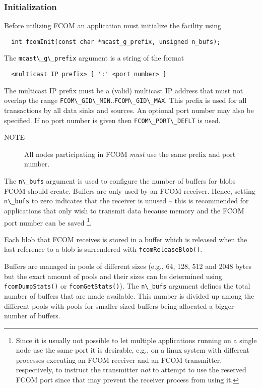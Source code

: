 \documentclass[11pt]{article}
\newcommand{\fcom}{FCOM}
\newcommand{\blob}{blob}
\newcommand{\cstl}[1]{{\lstinline+#1+}}
\newcommand{\note}[1]{
	\begin{description}
		\item[NOTE] #1
	\end{description}
}
\begin{document}
    \subsubsection{Initialization}
      Before utilizing \fcom{} an application must initialize
      the facility using
      \begin{verbatim}
  int fcomInit(const char *mcast_g_prefix, unsigned n_bufs);
      \end{verbatim}
      The \cstl{mcast\_g\_prefix} argument is a string of
      the format
      \begin{verbatim}
  <multicast IP prefix> [ ':' <port number> ]
      \end{verbatim}
      The multicast IP prefix must be a (valid) multicast
      IP address that must not overlap the range
      \cstl{FCOM\_GID\_MIN}..\cstl{FCOM\_GID\_MAX}. This
      prefix is used for all transactions by all data
      sinks and sources. An optional port number may
      also be specified. If no port number is given then
      \cstl{FCOM\_PORT\_DEFLT} is used.

      \note{All nodes participating in \fcom{} {\em must} use the
      same prefix and port number.}

      The \cstl{n\_bufs} argument is used to configure the
      number of buffers for \blob{}s \fcom{} should create.
      Buffers are only used by an \fcom{} receiver. Hence,
      setting \cstl{n\_bufs} to zero indicates that the
      receiver is unused -- this is recommended for applications
      that only wish to transmit data because memory and
      the \fcom{} port number can be saved%
\footnote{Since it is usually not possible to let multiple
applications running on a single node use the same port it
is desirable, e.g., on a linux system with different
processes executing an \fcom{} receiver and an \fcom{}
transmitter, respectively, to instruct the transmitter
{\em not} to attempt to use the reserved \fcom{} port since
that may prevent the receiver process from using it.}.

      Each \blob{} that \fcom{} receives is stored in
	  a buffer which is released when the last reference
      to a \blob{} is surrendered with \cstl{fcomReleaseBlob()}.

      Buffers are managed in pools of different sizes
      (e.g., 64, 128, 512 and 2048 bytes but the exact
      amount of pools and their sizes can be determined
      using \cstl{fcomDumpStats()} or \cstl{fcomGetStats()}).
      The \cstl{n\_bufs} argument defines the total
      number of buffers that are made available. This
      number is divided up among the different pools with
      pools for smaller-sized buffers being allocated a
      bigger number of buffers.
\end{document}
